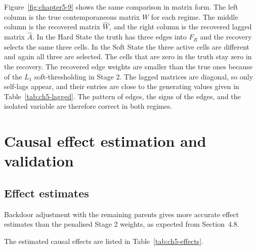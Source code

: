 Figure~\ref{fig:chapter5-9} shows the same comparison in matrix form. The left
column is the true contemporaneous matrix $W$ for each regime. The middle column is
the recovered matrix $\hat{W}$, and the right column is the recovered lagged matrix
$\hat{A}$. In the Hard State the truth has three edges into $F_R$ and the recovery
selects the same three cells. In the Soft State the three active cells are different
and again all three are selected. The cells that are zero in the truth stay zero in
the recovery. The recovered edge weights are smaller than the true ones because of
the $L_1$ soft-thresholding in Stage 2. The lagged matrices are diagonal, so only
self-lags appear, and their entries are close to the generating values given in
Table~\ref{tab:ch5-lagged}. The pattern of edges, the signs of the edges, and the
isolated variable are therefore correct in both regimes.


\section{Causal effect estimation and validation}


\subsection{Effect estimates}

Backdoor adjustment with the remaining parents gives more accurate effect estimates
than the penalised Stage 2 weights, as expected from Section~4.8.

The estimated causal effects are listed in Table~\ref{tab:ch5-effects}.



